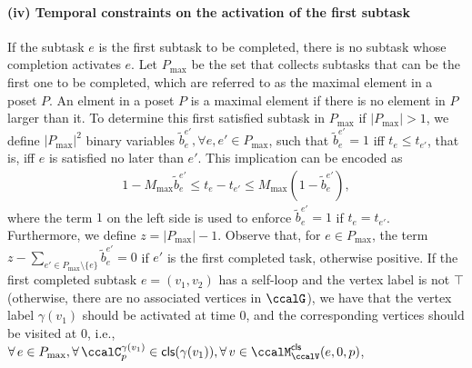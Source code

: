 \documentclass[Afour,sageh,times]{sagej}
\newcommand{\clause}[1]{\mathsf{cls}(#1)}
\begin{document}
{{{%

\paragraph{(iv) Temporal constraints on the activation of the first subtask}
If the subtask $e$ is the first subtask to be completed, there is no subtask whose completion activates $e$. Let $P_{\text{max}}$ be the set that collects subtasks that can be the first one to be completed, which are referred to as the maximal element in a poset $P$. An elment in a poset $P$ is a maximal element if there is no element in $P$ larger than it. To determine this first satisfied subtask in $P_{\text{max}}$ if $|P_{\text{max}}|>1$, we define $|P_{\text{max}}|^2$ binary variables $\tilde{b}_{e}^{e'}, \forall e, e' \in P_{\text{max}}$,  such that $\tilde{b}_{e}^{e'}=1$  iff $t_{e} \leq t_{e'}$, that is, iff $e$ is satisfied no later than  $e'$. This implication can be encoded as
\begingroup\makeatletter\def\f@size{10}\check@mathfonts
\def\maketag@@@#1{\hbox{\m@th\normalsize\normalfont#1}}%
\begin{align}
  1 -  M_{\text{max}} \tilde{b}_{e}^{e'} \leq t_{e} -  t_{e'} \leq M_{\text{max}} (1- \tilde{b}_{e}^{e'}) ,
\end{align}
  \endgroup
  where the term $1$ on the left side  is used to enforce $\tilde{b}_{e}^{e'}=1$ if $t_{e} = t_{e'}$. Furthermore, we define $z = |P_{\text{max}}| -1$. Observe that, for $e \in P_{\text{max}} $, the term $z -  \sum_{e' \in P_{\text{max}}\setminus \{e\}  } \tilde{b}_{e}^{e'} = 0$ if $e'$ is the first completed task, otherwise  positive. If the first completed subtask $e = (v_1 ,v_2)$ has a self-loop and the vertex label is not $\top$ (otherwise, there are no associated vertices in $\ccalG$), we have that the vertex label $\gamma(v_1)$ should be activated at time 0, and the corresponding vertices should be visited at 0,   i.e., $\forall\, e \in P_{\text{max}}, \forall\, \ccalC_p^{\gamma(v_1)} \in \clause{\gamma(v_1)}, \forall \,v \in \ccalM^\mathsf{cls}_\ccalV(e,0,p)$,
}}}
\end{document}
